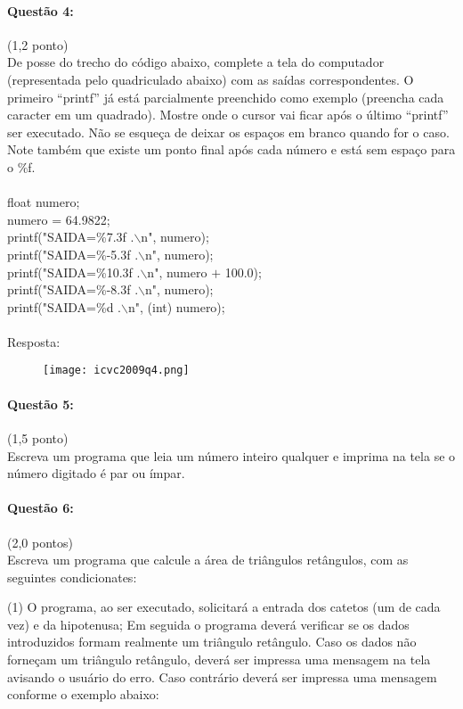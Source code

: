 \documentclass[12pt,a4paper]{article}
\begin{document}
\paragraph{Questão 4:}(1,2 ponto)\\
De posse do trecho do código abaixo, complete a tela do computador (representada pelo quadriculado abaixo) com as saídas correspondentes. O primeiro “printf” já está parcialmente preenchido como exemplo (preencha cada caracter em um quadrado). 
Mostre onde o cursor vai ficar após o último “printf” ser executado. Não se esqueça de deixar os espaços em branco quando for o caso. Note também que existe um ponto final após cada número e está sem espaço para o \%f.\\
\\
float numero;\\
numero = 64.9822;\\
printf("SAIDA=\%7.3f .$\backslash$n", numero);\\
printf("SAIDA=\%-5.3f .$\backslash$n", numero);\\
printf("SAIDA=\%10.3f .$\backslash$n", numero $+$ 100.0);\\
printf("SAIDA=\%-8.3f .$\backslash$n", numero);\\
printf("SAIDA=\%d .$\backslash$n", (int) numero);\\
\\Resposta:


\begin{figure}[ht]
\centering
\texttt{[image: icvc2009q4.png]}
\end{figure}



\paragraph{Questão 5:}(1,5 ponto)\\
Escreva um programa que leia um número inteiro qualquer e imprima na tela se o número digitado é par ou ímpar.

\paragraph{Questão 6:}(2,0 pontos)\\
Escreva um programa que calcule a área de triângulos retângulos, com as seguintes condicionates:

\begin{tasks}(1)
\task O programa, ao ser executado, solicitará a entrada dos catetos (um de cada vez) e da hipotenusa;
\task Em seguida o programa deverá verificar se os dados introduzidos formam realmente um triângulo retângulo. Caso os dados não forneçam um triângulo retângulo, deverá ser impressa uma mensagem na tela avisando o usuário do erro. Caso contrário deverá ser impressa uma mensagem conforme o exemplo abaixo:
\end{tasks}
\end{document}
